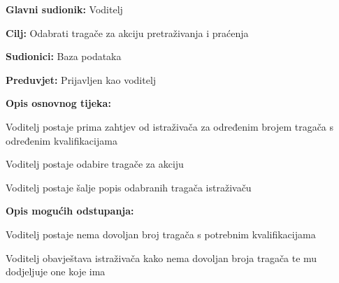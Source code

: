 						\noindent {}
					\begin{packed_item}
						
						\item \textbf{Glavni sudionik: }Voditelj
						\item  \textbf{Cilj:} Odabrati tragače za akciju pretraživanja i praćenja
						\item  \textbf{Sudionici:} Baza podataka
						\item  \textbf{Preduvjet:} Prijavljen kao voditelj
						\item  \textbf{Opis osnovnog tijeka:}
						
						\item[] \begin{packed_enum}
							
							\item Voditelj postaje prima zahtjev od istraživača za određenim brojem tragača s određenim kvalifikacijama
							\item  Voditelj postaje odabire tragače za akciju
							\item Voditelj postaje šalje popis odabranih tragača istraživaču
							
						\end{packed_enum}
						
						\item  \textbf{Opis mogućih odstupanja:}
						
						\item[] \begin{packed_item}
							
							\item[2.a] Voditelj postaje nema dovoljan broj tragača s potrebnim kvalifikacijama
							\item[] \begin{packed_enum}
								
								\item Voditelj obavještava istraživača kako nema dovoljan broja tragača te mu dodjeljuje one koje ima
								
							\end{packed_enum}
							
						\end{packed_item}
						
					\end{packed_item}
					
					
					
